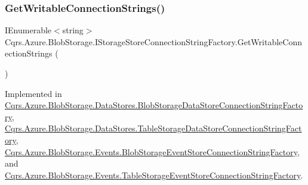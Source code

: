 \subsubsection{\texorpdfstring{Get\+Writable\+Connection\+Strings()}{GetWritableConnectionStrings()}}
{\footnotesize\ttfamily I\+Enumerable$<$string$>$ Cqrs.\+Azure.\+Blob\+Storage.\+I\+Storage\+Store\+Connection\+String\+Factory.\+Get\+Writable\+Connection\+Strings (\begin{DoxyParamCaption}{ }\end{DoxyParamCaption})}



Implemented in \hyperlink{classCqrs_1_1Azure_1_1BlobStorage_1_1DataStores_1_1BlobStorageDataStoreConnectionStringFactory_a71b549351646fd4261b3f52f264759f4_a71b549351646fd4261b3f52f264759f4}{Cqrs.\+Azure.\+Blob\+Storage.\+Data\+Stores.\+Blob\+Storage\+Data\+Store\+Connection\+String\+Factory}, \hyperlink{classCqrs_1_1Azure_1_1BlobStorage_1_1DataStores_1_1TableStorageDataStoreConnectionStringFactory_a65b6f404ac2434c6366af73a22e914d1_a65b6f404ac2434c6366af73a22e914d1}{Cqrs.\+Azure.\+Blob\+Storage.\+Data\+Stores.\+Table\+Storage\+Data\+Store\+Connection\+String\+Factory}, \hyperlink{classCqrs_1_1Azure_1_1BlobStorage_1_1Events_1_1BlobStorageEventStoreConnectionStringFactory_a002b45d6a893b1b3024b0e7c97f1c9ac_a002b45d6a893b1b3024b0e7c97f1c9ac}{Cqrs.\+Azure.\+Blob\+Storage.\+Events.\+Blob\+Storage\+Event\+Store\+Connection\+String\+Factory}, and \hyperlink{classCqrs_1_1Azure_1_1BlobStorage_1_1Events_1_1TableStorageEventStoreConnectionStringFactory_a07406c2607bdd42dd13116b92fc6b665_a07406c2607bdd42dd13116b92fc6b665}{Cqrs.\+Azure.\+Blob\+Storage.\+Events.\+Table\+Storage\+Event\+Store\+Connection\+String\+Factory}.

